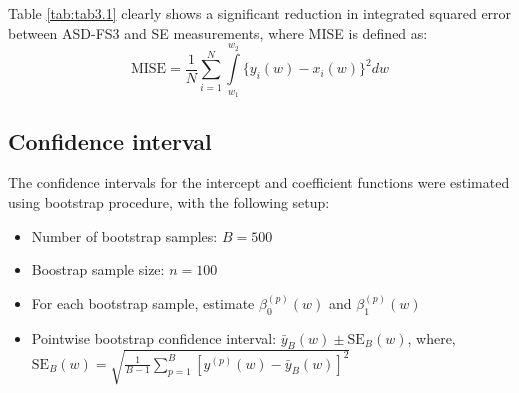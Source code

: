 Table \ref{tab:tab3.1} clearly shows a significant reduction in integrated squared error between ASD-FS3 and SE measurements, where MISE is defined as:
\begin{equation}
\text{MISE} = \frac{1}{N} \sum \limits_{i = 1} ^{N} \int\limits_{w_1}^{w_2} \{y_i(w) - x_i(w)\}^2dw
\end{equation}

\subsection*{Confidence interval}
The confidence intervals for the intercept and coefficient functions were estimated using bootstrap procedure, with the following setup:
\begin{itemize}
\item Number of bootstrap samples: $B = 500$
\item Boostrap sample size: $n = 100$
\item For each bootstrap sample, estimate $\beta_0^{(p)}(w)$ and $\beta_1^{(p)}(w)$
\item Pointwise bootstrap confidence interval: $\bar{y}_B(w) \pm \text{SE}_B(w)$, where, \\
$\text{SE}_B(w) = \sqrt{\frac{1}{B - 1} \sum\limits_{p = 1}^B [y^{(p)}(w) - \bar{y}_B(w)]^2}$
\end{itemize}
